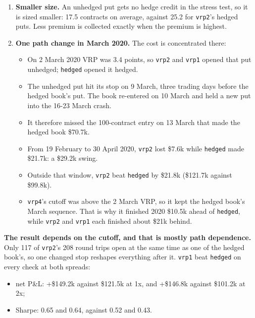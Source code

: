 \documentclass{article}
\begin{document}
\begin{enumerate}

\item \textbf{Smaller size.} An unhedged put gets no hedge credit in the stress test, so it is sized smaller: 17.5 contracts on average, against 25.2 for \texttt{vrp2}'s hedged puts. Less premium is collected exactly when the premium is highest.

\item \textbf{One path change in March 2020.} The cost is concentrated there:

\begin{itemize}

\item On 2 March 2020 VRP was 3.4 points, so \texttt{vrp2} and \texttt{vrp1} opened that put unhedged; \texttt{hedged} opened it hedged.

\item The unhedged put hit its stop on 9 March, three trading days before the hedged book's put. The book re-entered on 10 March and held a new put into the 16-23 March crash.

\item It therefore missed the 100-contract entry on 13 March that made the hedged book \$70.7k.

\item From 19 February to 30 April 2020, \texttt{vrp2} lost \$7.6k while \texttt{hedged} made \$21.7k: a \$29.2k swing.

\item Outside that window, \texttt{vrp2} beat \texttt{hedged} by \$21.8k (\$121.7k against \$99.8k).

\item \texttt{vrp4}'s cutoff was above the 2 March VRP, so it kept the hedged book's March sequence. That is why it finished 2020 \$10.5k ahead of \texttt{hedged}, while \texttt{vrp2} and \texttt{vrp1} each finished about \$21k behind.

\end{itemize}

\end{enumerate}

\textbf{The result depends on the cutoff, and that is mostly path dependence.} Only 117 of \texttt{vrp2}'s 208 round trips open at the same time as one of the hedged book's, so one changed stop reshapes everything after it. \texttt{vrp1} beat \texttt{hedged} on every check at both spreads:

\begin{itemize}

\item net P\&L: +\$149.2k against \$121.5k at 1x, and +\$146.8k against \$101.2k at 2x;

\item Sharpe: 0.65 and 0.64, against 0.52 and 0.43.

\end{itemize}
\end{document}

